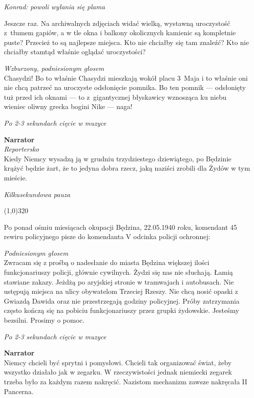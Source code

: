 \documentclass[11pt,a4paper,oneside]{article}
\begin{document}
{\color{konrad}   \emph{Konrad: powoli wyłania się plama}}

Jeszcze raz. Na archiwalnych zdjęciach widać wielką, wystawną
uroczystość z~tłumem gapiów, a w tle okna i balkony okolicznych
kamienic są kompletnie puste?  Przecież to są najlepsze miejsca. Kto
nie chciałby się tam znaleźć?  Kto nie chciałby stamtąd właśnie
oglądać uroczystości?

{\color{light-gray} \emph{Wzburzony, podniesionym głosem}}\\
Chasydzi! Bo to właśnie Chasydzi mieszkają wokół placu 3~Maja i to
właśnie oni nie chcą patrzeć na uroczyste odsłonięcie pomnika. Bo ten
pomnik --- odsłonięty tuż przed ich oknami --- to z~gigantycznej błyskawicy
wznosząca ku niebu wieniec oliwny grecka bogini Nike --- naga!

{\color{light-gray} \emph{Po 2-3 sekundach cięcie w muzyce}}

\textbf{Narrator}\\
{\color{light-gray} \emph{Reportersko}}\\
Kiedy Niemcy wysadzą ją w grudniu trzydziestego dziewiątego, po
Będzinie krążyć będzie żart, że to jedyna dobra rzecz, jaką naziści
zrobili dla Żydów w tym mieście.

{\color{light-gray} \emph{Kilkusekundowa pauza}}

\line(1,0){320}

Po ponad ośmiu miesiącach okupacji Będzina, 22.05.1940 roku, komendant
45 rewiru policyjnego pisze do komendanta V odcinka policji 
ochronnej:

{\color{light-gray} \emph{Podniesionym głosem}}\\
Zwracam się z prośbą o nadesłanie do miasta Będzina większej ilości
funkcjonariuszy policji, głównie cywilnych. 
 Żydzi się nas nie
słuchają. Łamią stawiane zakazy. Jeżdżą po aryjskiej stronie
w tramwajach i autobusach. Nie ustępują miejsca na ulicy obywatelom
Trzeciej Rzeszy. Nie chcą nosić opaski z Gwiazdą Dawida oraz nie
przestrzegają godziny policyjnej. Próby zatrzymania często kończą się
na pobiciu funkcjonariuszy przez grupki żydowskie. Jesteśmy bezsilni.
Prosimy o pomoc.

{\color{light-gray} \emph{Po 2-3 sekundach cięcie w muzyce}}


\textbf{Narrator}\\
Niemcy chcieli być sprytni i pomysłowi. Chcieli tak organizować świat,
żeby wszystko działało jak w zegarku. W rzeczywistości jednak
niemiecki zegarek trzeba było za każdym razem nakręcić. Nazistom
mechanizm zawsze nakręcała II Pancerna. 
\end{document}
